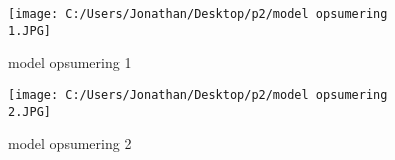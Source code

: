 \begin{figure}[h] 
	\centering
	\texttt{[image: C:/Users/Jonathan/Desktop/p2/model opsumering 1.JPG]}
	\caption{model opsumering 1}
	\label{fig:j06}
\end{figure}

\begin{figure}[h] 
	\centering
	\texttt{[image: C:/Users/Jonathan/Desktop/p2/model opsumering 2.JPG]}
	\caption{model opsumering 2}
	\label{fig:j06}
\end{figure}

